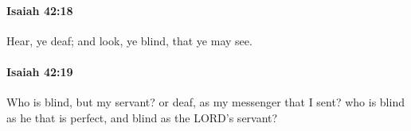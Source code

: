 		\paragraph{Isaiah 42:18} %
			\label{ISAIAH-42-18}

			Hear, ye deaf; and look, ye blind, that ye may see.


		\paragraph{Isaiah 42:19} %
			\label{ISAIAH-42-19}

			Who is blind, but my servant? or deaf, as my messenger that I sent? who is blind as he that is perfect, and blind as the LORD's servant?


